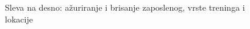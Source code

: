 \documentclass[../main.tex]{subfiles}
\begin{document}
\begin{figure}[!ht]
\begin{center}
\end{center}
\caption{Sleva na desno: ažuriranje i brisanje zaposlenog, vrste treninga i lokacije}
\label{fig:administrator_azuriranja}
\end{figure}
\end{document}
